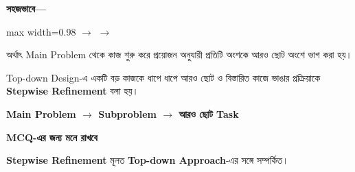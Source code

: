 \textbf{সহজভাবে—}

\begin{center}
\begin{adjustbox}{max width=0.98\linewidth}
\quad
\(\longrightarrow\)
\quad
{}
\quad
\(\longrightarrow\)
\quad
{}
\end{adjustbox}
\end{center}

অর্থাৎ Main Problem থেকে কাজ শুরু করে প্রয়োজন অনুযায়ী
প্রতিটি অংশকে আরও ছোট অংশে ভাগ করা হয়।


Top-down Design-এ একটি বড় কাজকে ধাপে ধাপে আরও ছোট ও
বিস্তারিত কাজে ভাঙার প্রক্রিয়াকে
\textbf{Stepwise Refinement} বলা হয়।

\begin{center}

\textbf{
Main Problem
\(\longrightarrow\)
Subproblem
\(\longrightarrow\)
আরও ছোট Task
}

\end{center}

\begin{rememberbox}

\textbf{\color{deepOrange}MCQ-এর জন্য মনে রাখবে}

\textbf{Stepwise Refinement} মূলত
\textbf{Top-down Approach}-এর সঙ্গে সম্পর্কিত।

\end{rememberbox}

